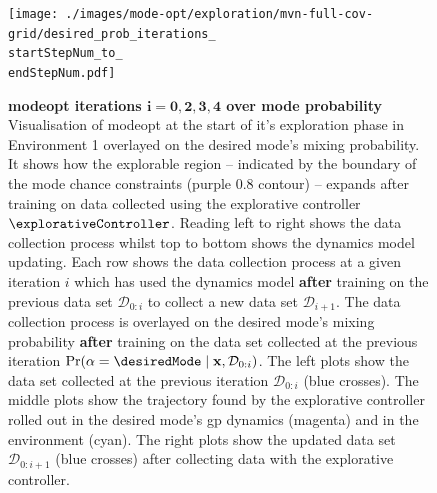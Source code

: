 \documentclass{mimosis-class/mimosis}
\numberwithin{equation}{chapter}
\newcommand{\state}{\ensuremath{\mathbf{x}}}
\newcommand{\dataset}{\ensuremath{\mathcal{D}}}
\newcommand{\modeVar}{\ensuremath{\alpha}}
\begin{document}
{\renewcommand{\startStepNum}{0}
\renewcommand{\endStepNum}{4}
\begin{figure}
\centering
\texttt{[image: ./images/mode-opt/exploration/mvn-full-cov-grid/desired\_prob\_iterations\_\\startStepNum\_to\_\\endStepNum.pdf]}
\caption[\acrshort{modeopt} iterations $\mathbf{i=0, 2, 3, 4}$ over mode probability]{\textbf{\acrshort{modeopt} iterations $\mathbf{i=0, 2, 3, 4}$ over mode probability}
Visualisation of \acrshort{modeopt} at the start of it's exploration phase in Environment 1 overlayed
on the desired mode's mixing probability.
It shows how the explorable region -- indicated by the boundary of the mode chance constraints (purple 0.8 contour)
-- expands after training on data collected using the explorative controller $\explorativeController$.
Reading left to right shows the data collection process whilst top to bottom shows the dynamics model updating.
Each row shows the data collection process at a given iteration $i$ which has used the dynamics model
\textbf{after} training on the previous data set $\mathcal{D}_{0:i}$ to collect a new data set $\dataset_{i+1}$.
The data collection process is overlayed on the desired mode's mixing probability \textbf{after} training on the
data set collected at the previous iteration $\Pr(\modeVar=\desiredMode \mid \state, \dataset_{0:i})$.
The left plots show the data set collected at the previous iteration $\dataset_{0:i}$ (blue crosses).
The middle plots show the trajectory found by the explorative controller rolled out in the desired mode's \acrshort{gp}
dynamics (magenta) and in the environment (cyan).
The right plots show the updated data set $\dataset_{0:i+1}$ (blue crosses) after collecting data with the explorative
controller.}
\label{fig-explorative-traj-opt-over-prob-7-\startStepNum-\endStepNum}
\end{figure}

}
\end{document}
